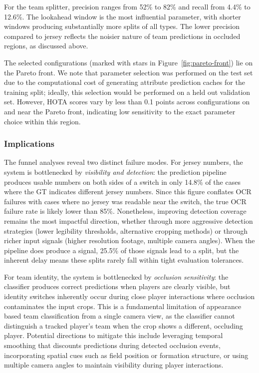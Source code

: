 For the team splitter, precision ranges from 52\% to 82\% and recall from 4.4\% to 12.6\%. The lookahead window is the most influential parameter, with shorter windows producing substantially more splits of all types. The lower precision compared to jersey reflects the noisier nature of team predictions in occluded regions, as discussed above.

The selected configurations (marked with stars in Figure~\ref{fig:pareto-front}) lie on the Pareto front. We note that parameter selection was performed on the test set due to the computational cost of generating attribute prediction caches for the training split; ideally, this selection would be performed on a held out validation set. However, HOTA scores vary by less than 0.1 points across configurations on and near the Pareto front, indicating low sensitivity to the exact parameter choice within this region.

\subsubsection{Implications}

The funnel analyses reveal two distinct failure modes. For jersey numbers, the system is bottlenecked by \emph{visibility and detection}: the prediction pipeline produces usable numbers on both sides of a switch in only 14.8\% of the cases where the GT indicates different jersey numbers. Since this figure conflates OCR failures with cases where no jersey was readable near the switch, the true OCR failure rate is likely lower than 85\%. Nonetheless, improving detection coverage remains the most impactful direction, whether through more aggressive detection strategies (lower legibility thresholds, alternative cropping methods) or through richer input signals (higher resolution footage, multiple camera angles). When the pipeline does produce a signal, 25.5\% of those signals lead to a split, but the inherent delay means these splits rarely fall within tight evaluation tolerances.

For team identity, the system is bottlenecked by \emph{occlusion sensitivity}: the classifier produces correct predictions when players are clearly visible, but identity switches inherently occur during close player interactions where occlusion contaminates the input crops. This is a fundamental limitation of appearance based team classification from a single camera view, as the classifier cannot distinguish a tracked player's team when the crop shows a different, occluding player. Potential directions to mitigate this include leveraging temporal smoothing that discounts predictions during detected occlusion events, incorporating spatial cues such as field position or formation structure, or using multiple camera angles to maintain visibility during player interactions.


